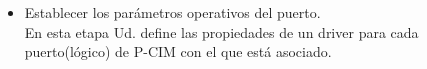 \begin{itemize}
\item Establecer los parámetros operativos del puerto.\\
  En esta etapa Ud. define las propiedades de un driver para cada puerto(lógico)
  de P-CIM con el que está asociado.
\end{itemize}
